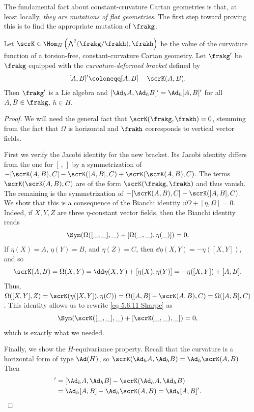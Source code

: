 The fundamental fact about constant-cruvature Cartan geometries is that, at least locally, \emph{they are mutations of flat geometries}. The first step toward proving this is to find the appropriate mutation of $\frakg$.

\begin{prop}\label{prop 5.6.8 Sharpe}
    Let $\scrK\in \Hom_H\left(\bigwedge^2(\frakg\slash\frakh),\frakh\right)$ be the value of the curvature function of a torsion-free, constant-curvature Cartan geometry. Let $\frakg'$ be $\frakg$ equipped with the \emph{curvature-deformed bracket} defined by 
    \[[A,B]'\coloneqq [A,B]-\scrK(A,B).\label{eq deformed bracket}\] 
    Then $\frakg'$ is a Lie algebra and $[\Ad_h A,\Ad_h B]'=\Ad_h [A,B]'$ for all $A,B\in \frakg$, $h\in H$.
\end{prop}
\begin{proof}
    We will need the general fact that $\scrK(\frakg,\frakh)=0$, stemming from the fact that $\Omega$ is horizontal and $\frakh$ corresponds to vertical vector fields.

    First we verify the Jacobi identity for the new bracket. Its Jacobi identity differs from the one for $[\,,\,]$ by a symmetrization of $-[\scrK(A,B),C]-\scrK([A,B],C)+\scrK(\scrK(A,B),C)$. The terms $\scrK(\scrK(A,B),C)$ are of the form $\scrK(\frakg,\frakh)$ and thus vanish. The remaining is the symmetrization of $-[\scrK(A,B),C]-\scrK([A,B],C)$. We show that this is a consequence of the Bianchi identity $\dd \Omega+[\eta,\Omega]=0$. Indeed, if $X,Y,Z$ are three $\eta$-constant vector fields, then the Bianchi identity reads 
    \[\Sym(\Omega([\_,\_],\_)+[\Omega(\_,\_),\eta(\_)])=0.\label{eq 5.6.11 Sharpe}\]
    If $\eta(X)=A$, $\eta(Y)=B$, and $\eta(Z)=C$, then $\dd\eta(X,Y)=-\eta([X,Y])$, and so 
    \[\scrK(A,B)=\Omega(X,Y)=\dd\eta(X,Y)+[\eta(X),\eta(Y)]=-\eta([X,Y])+[A,B].\]
    Thus, $\Omega([X,Y],Z)=\scrK(\eta([X,Y]),\eta(C))=\Omega([A,B]-\scrK(A,B),C)=\Omega([A,B],C)$. This identity allows us to rewrite \eqref{eq 5.6.11 Sharpe} as 
    \[\Sym(\scrK([\_,\_],\_)+[\scrK(\_,\_),\_])=0,\]
    which is exactly what we needed.

    Finally, we show the $H$-equivariance property. Recall that the curvature is a horizontal form of type $\Ad(H)$, so $\scrK(\Ad_h A,\Ad_h B)=\Ad_h \scrK(A,B)$. Then 
    \begin{align}
        [\Ad_h A,\Ad_h B]'&=[\Ad_h A,\Ad_h B]-\scrK(\Ad_h A,\Ad_h B)\notag\\
        &=\Ad_h [A,B]-\Ad_h \scrK(A,B)=\Ad_h[A,B]'.
    \end{align}
\end{proof}


